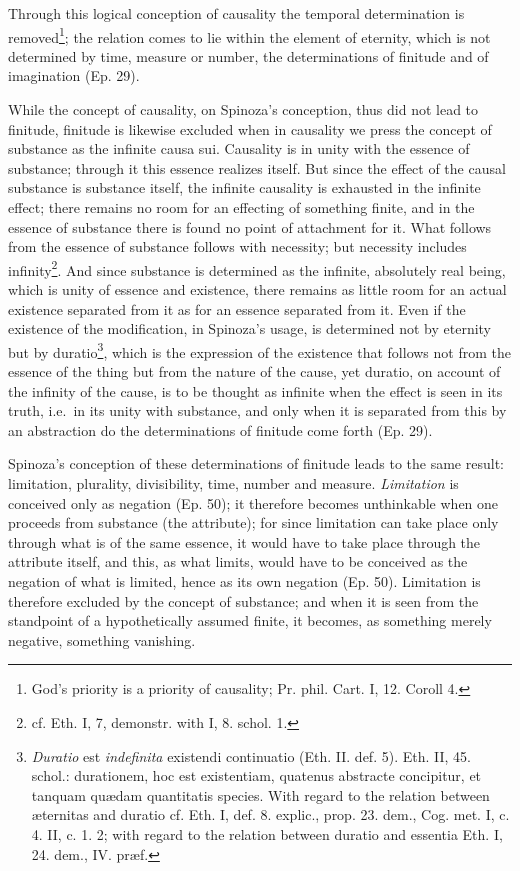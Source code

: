 \documentclass[12pt,a4paper,openany]{book}
\newcommand{\opage}[1]{\marginnote{\footnotesize\textit{[#1]}}}
\begin{document}
Through this logical conception of causality the temporal determination is
removed\footnote{God's priority is a priority of causality; Pr. phil.
Cart. I, 12. Coroll 4.}; the relation comes to lie within the element of eternity,
which is not determined by time, measure or number, the determinations of finitude and
of imagination (Ep. 29).

While the concept of causality, on Spinoza's conception, thus did not
lead to finitude, finitude is likewise excluded when in
causality we press the concept of substance as the infinite causa sui.
Causality is in unity with the essence of substance; through it
this essence realizes itself. But
\opage{57}\setcounter{footnote}{0}since the effect of the causal substance is substance itself, the
infinite causality is exhausted in the infinite effect; there remains no
room for an effecting of something finite, and in the essence of substance there is
found no point of attachment for it. What follows from the essence of substance
follows with necessity; but necessity includes
infinity\footnote{cf. Eth. I, 7, demonstr. with I, 8. schol. 1.}.
And since substance is determined as the infinite, absolutely real
being, which is unity of essence and existence, there remains as little
room for an actual existence separated from it as for an essence
separated from it. Even if the existence of the modification, in Spinoza's
usage, is determined not by eternity but by
duratio\footnote{\emph{Duratio} est \emph{indefinita} existendi continuatio
(Eth. II. def. 5). Eth. II, 45. schol.: durationem, hoc est
existentiam, quatenus abstracte concipitur, et tanquam quædam
quantitatis species. With regard to the relation between æternitas and
duratio cf. Eth. I, def. 8. explic., prop. 23. dem., Cog. met.
I, c. 4. II, c. 1. 2; with regard to the relation between duratio and
essentia Eth. I, 24. dem., IV. præf.}, which is the expression of the
existence that follows not from the essence of the thing but from the nature of the cause,
yet duratio, on account of the infinity of the cause, is to be thought
as infinite when the effect is seen in its truth, i.e.\ in its unity with
substance, and only when it is separated from this by an abstraction
do the determinations of finitude come forth (Ep. 29).

Spinoza's conception of these determinations of finitude leads to the same result:
limitation, plurality, divisibility, time, number
and measure. \emph{Limitation} is conceived only as negation (Ep. 50); it
therefore becomes unthinkable when one proceeds from substance
(the attribute); for since limitation can take place only through what is of the same essence,
it would have to take place through the attribute itself, and this, as what limits,
would have to be conceived as the negation of what is limited,
hence as its own negation
(Ep. 50). Limitation is therefore excluded by the concept of substance; and
when it is seen from the standpoint of a hypothetically
\opage{58} assumed finite, it becomes, as something merely negative, something
vanishing.
\end{document}
